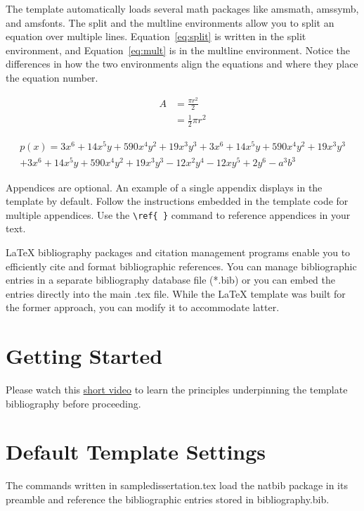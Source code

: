  \label{chpt:equations}
The template automatically loads several math packages like amsmath, amssymb, and amsfonts. The split and the multline environments allow you to split an equation over multiple lines. Equation~\ref{eq:split} is written in the split environment, and Equation~\ref{eq:mult} is in the multline environment. Notice the differences in how the two environments align the equations and where they place the equation number.

\begin{equation} \label{eq:split}
\begin{split}
A & = \frac{\pi r^2}{2} \\
 & = \frac{1}{2} \pi r^2
\end{split}
\end{equation}

\begin{multline} \label{eq:mult}
p(x) = 3x^6 + 14x^5y + 590x^4y^2 + 19x^3y^3 + 3x^6 + 14x^5y + 590x^4y^2 + 19x^3y^3\\ 
+ 3x^6 + 14x^5y + 590x^4y^2 + 19x^3y^3- 12x^2y^4 - 12xy^5 + 2y^6 - a^3b^3
\end{multline}

Appendices are optional. An example of a single appendix displays in the template by default. Follow the instructions embedded in the template code for multiple appendices. Use the \verb|\ref{ }| command to reference appendices in your text.

 \label{chpt:citebib}
LaTeX bibliography packages and citation management programs enable you to efficiently cite and format bibliographic references. You can manage bibliographic entries in a separate bibliography database file (*.bib) or you can embed the entries directly into the main .tex file. While the LaTeX template was built for the former approach, you can modify it to accommodate latter.

\section{Getting Started}
Please watch this \underline{\href{https://mediaspace.library.upenn.edu/media/LaTeX+Fundamentals+-+6.1+Citations+\%26+Bibliographies+-+Think+in+LaTeX\%2C+BibTeX\%2C+and+BibLaTeX/1_7dyh4j58}{short video}} to learn the principles underpinning the template bibliography before proceeding.

\section{Default Template Settings}
The commands written in sampledissertation.tex load the natbib package in its preamble and reference the bibliographic entries stored in bibliography.bib.

